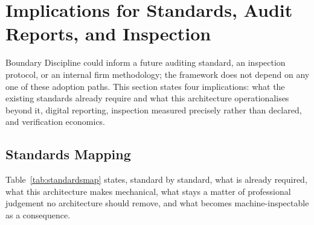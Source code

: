 \documentclass[11pt,a4paper]{article}
\theoremstyle{definition}
\theoremstyle{remark}
\begin{document}
\section{Implications for Standards, Audit Reports, and Inspection}
\label{sec:implications}

Boundary Discipline could inform a future auditing standard, an inspection protocol, or an internal firm methodology; the framework does not depend on any one of these adoption paths. This section states four implications: what the existing standards already require and what this architecture operationalises beyond it, digital reporting, inspection measured precisely rather than declared, and verification economics.

\subsection{Standards Mapping}
\label{sec:standardsmap}

Table~\ref{tab:standardsmap} states, standard by standard, what is already required, what this architecture makes mechanical, what stays a matter of professional judgement no architecture should remove, and what becomes machine-inspectable as a consequence.
\end{document}
